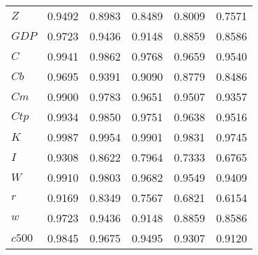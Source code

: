 \begin{center}
\begin{longtable}{lccccc}
$Z         $	 & 	    0.9492	 & 	    0.8983	 & 	    0.8489	 & 	    0.8009	 & 	    0.7571 \\ 
$GDP       $	 & 	    0.9723	 & 	    0.9436	 & 	    0.9148	 & 	    0.8859	 & 	    0.8586 \\ 
$C         $	 & 	    0.9941	 & 	    0.9862	 & 	    0.9768	 & 	    0.9659	 & 	    0.9540 \\ 
$Cb        $	 & 	    0.9695	 & 	    0.9391	 & 	    0.9090	 & 	    0.8779	 & 	    0.8486 \\ 
$Cm        $	 & 	    0.9900	 & 	    0.9783	 & 	    0.9651	 & 	    0.9507	 & 	    0.9357 \\ 
$Ctp       $	 & 	    0.9934	 & 	    0.9850	 & 	    0.9751	 & 	    0.9638	 & 	    0.9516 \\ 
$K         $	 & 	    0.9987	 & 	    0.9954	 & 	    0.9901	 & 	    0.9831	 & 	    0.9745 \\ 
$I         $	 & 	    0.9308	 & 	    0.8622	 & 	    0.7964	 & 	    0.7333	 & 	    0.6765 \\ 
$W         $	 & 	    0.9910	 & 	    0.9803	 & 	    0.9682	 & 	    0.9549	 & 	    0.9409 \\ 
$r         $	 & 	    0.9169	 & 	    0.8349	 & 	    0.7567	 & 	    0.6821	 & 	    0.6154 \\ 
$w         $	 & 	    0.9723	 & 	    0.9436	 & 	    0.9148	 & 	    0.8859	 & 	    0.8586 \\ 
$c500      $	 & 	    0.9845	 & 	    0.9675	 & 	    0.9495	 & 	    0.9307	 & 	    0.9120 \\ 
\end{longtable}
 \end{center}
